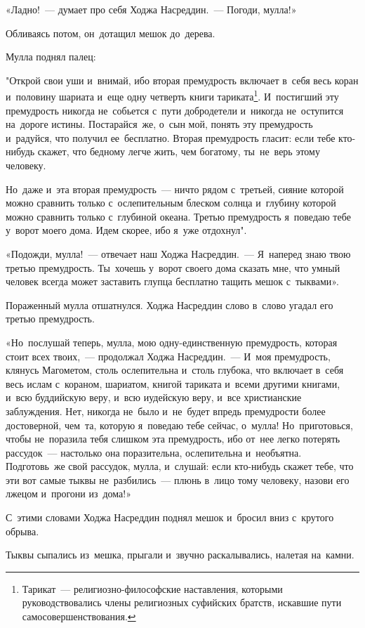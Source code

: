 \documentclass[12pt,a4paper]{book}
\begin{document}
«Ладно!~— думает про себя Ходжа Насреддин.~— Погоди, мулла!»

Обливаясь потом, он~дотащил мешок до~дерева.

Мулла поднял палец:

"Открой свои уши и~внимай, ибо вторая премудрость включает в~себя весь коран и~половину шариата и~еще одну четверть книги тариката\footnote{Тарикат~— религиозно-философские наставления, которыми руководствовались члены религиозных суфийских братств, искавшие пути самосовершенствования.}. И~постигший эту премудрость никогда не~собьется с~пути добродетели и~никогда не~оступится на~дороге истины. Постарайся~же, о~сын мой, понять эту премудрость и~радуйся, что получил ее~бесплатно. Вторая премудрость гласит: если тебе кто-нибудь скажет, что бедному легче жить, чем богатому, ты~не~верь этому человеку.

Но~даже и~эта вторая премудрость~— ничто рядом с~третьей, сияние которой можно сравнить только с~ослепительным блеском солнца и~глубину которой можно сравнить только с~глубиной океана. Третью премудрость я~поведаю тебе у~ворот моего дома. Идем скорее, ибо я~уже отдохнул".

«Подожди, мулла!~— отвечает наш Ходжа Насреддин.~— Я~наперед знаю твою третью премудрость. Ты~хочешь у~ворот своего дома сказать мне, что умный человек всегда может заставить глупца бесплатно тащить мешок с~тыквами».

Пораженный мулла отшатнулся. Ходжа Насреддин слово в~слово угадал его третью премудрость.

«Но~послушай теперь, мулла, мою одну-единственную премудрость, которая стоит всех твоих,~— продолжал Ходжа Насреддин.~— И~моя премудрость, клянусь Магометом, столь ослепительна и~столь глубока, что включает в~себя весь ислам с~кораном, шариатом, книгой тариката и~всеми другими книгами, и~всю буддийскую веру, и~всю иудейскую веру, и~все христианские заблуждения. Нет, никогда не~было и~не~будет впредь премудрости более достоверной, чем~та, которую я~поведаю тебе сейчас, о~мулла! Но~приготовься, чтобы не~поразила тебя слишком эта премудрость, ибо от~нее легко потерять рассудок~— настолько она поразительна, ослепительна и~необъятна. Подготовь~же свой рассудок, мулла, и~слушай: если кто-нибудь скажет тебе, что эти вот самые тыквы не~разбились~— плюнь в~лицо тому человеку, назови его лжецом и~прогони из~дома!»

С~этими словами Ходжа Насреддин поднял мешок и~бросил вниз с~крутого обрыва.

Тыквы сыпались из~мешка, прыгали и~звучно раскалывались, налетая на~камни.
\end{document}
